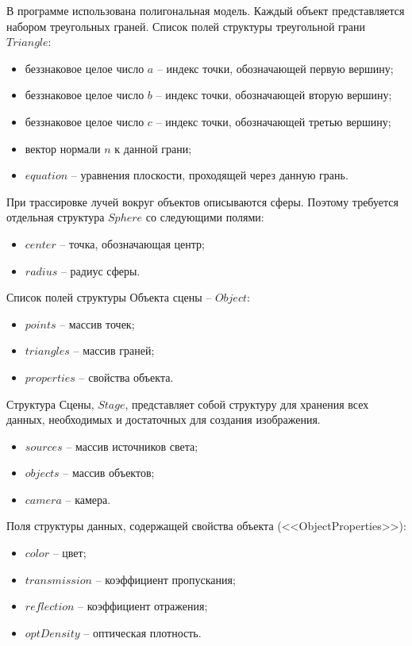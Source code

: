{    В программе использована полигональная модель.
    Каждый объект представляется набором треугольных граней.
    Список полей структуры треугольной грани $Triangle$:
    \begin{itemize}
        \item беззнаковое целое число $a$ --
        индекс точки, обозначающей первую вершину;
        \item беззнаковое целое число $b$ --
        индекс точки, обозначающей вторую вершину;
        \item беззнаковое целое число $c$ --
        индекс точки, обозначающей третью вершину;
        \item вектор нормали $n$ к данной грани;
        \item $equation$ -- уравнения плоскости, проходящей через данную грань.
    \end{itemize}
    
    При трассировке лучей вокруг объектов описываются сферы.
    Поэтому требуется отдельная структура $Sphere$ со следующими полями:
    \begin{itemize}
        \item $center$ -- точка, обозначающая центр;
        \item $radius$ -- радиус сферы.
    \end{itemize}
    
    Список полей структуры Объекта сцены -- $Object$:
    \begin{itemize}
        \item $points$ -- массив точек;
        \item $triangles$ -- массив граней;
        \item $properties$ -- свойства объекта.
    \end{itemize}
    
    Структура Сцены, $Stage$, представляет собой структуру для
    хранения всех данных, необходимых и достаточных для создания изображения.
    \begin{itemize}
        \item $sources$ -- массив источников света;
        \item $objects$ -- массив объектов;
        \item $camera$ -- камера.
    \end{itemize}
    
    Поля структуры данных, содержащей свойства объекта (<<ObjectProperties>>):
    \begin{itemize}
        \item $color$ -- цвет;
        \item $transmission$ -- коэффициент пропускания;
        \item $reflection$ -- коэффициент отражения;
        \item $optDensity$ -- оптическая плотность.
    \end{itemize}
    
}
